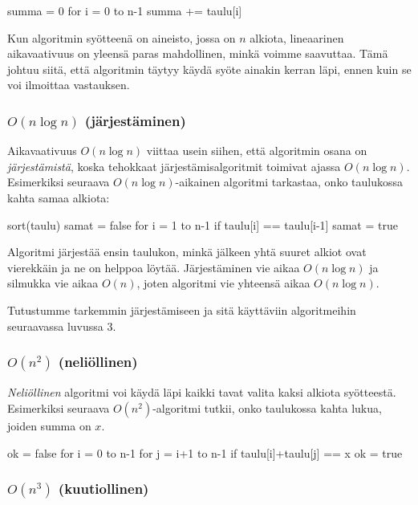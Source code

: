 \begin{code}
summa = 0
for i = 0 to n-1
    summa += taulu[i]
\end{code}

Kun algoritmin syötteenä on aineisto, jossa on $n$ alkiota,
lineaarinen aikavaativuus on yleensä paras mahdollinen,
minkä voimme saavuttaa.
Tämä johtuu siitä, että algoritmin täytyy käydä syöte
ainakin kerran läpi, ennen kuin se voi ilmoittaa vastauksen.

\subsubsection{$O(n \log n)$ (järjestäminen)}

Aikavaativuus $O(n \log n)$ viittaa usein siihen,
että algoritmin osana on \emph{järjes\-tämistä},
koska tehokkaat järjestämisalgoritmit
toimivat ajassa $O(n \log n)$.
Esimerkiksi seuraava $O(n \log n)$-aikainen
algoritmi tarkastaa, onko taulukossa kahta samaa alkiota:

\begin{code}
sort(taulu)
samat = false
for i = 1 to n-1
    if taulu[i] == taulu[i-1]
        samat = true
\end{code}

Algoritmi järjestää ensin taulukon, minkä jälkeen yhtä
suuret alkiot ovat vierekkäin ja ne on helppoa löytää.
Järjestäminen vie aikaa $O(n \log n)$
ja silmukka vie aikaa $O(n)$, joten algoritmi vie
yhteensä aikaa $O(n \log n)$.

Tutustumme tarkemmin järjestämiseen ja sitä käyttäviin
algoritmeihin seuraavassa luvussa 3.


\subsubsection{$O(n^2)$ (neliöllinen)}

\emph{Neliöllinen} algoritmi voi käydä läpi kaikki tavat valita
kaksi alkiota syöt\-teestä.
Esimerkiksi seuraava $O(n^2)$-algoritmi tutkii, onko taulukossa
kahta lukua, joiden summa on $x$.

\begin{code}
ok = false
for i = 0 to n-1
    for j = i+1 to n-1
        if taulu[i]+taulu[j] == x
            ok = true
\end{code}


\subsubsection{$O(n^3)$ (kuutiollinen)}

